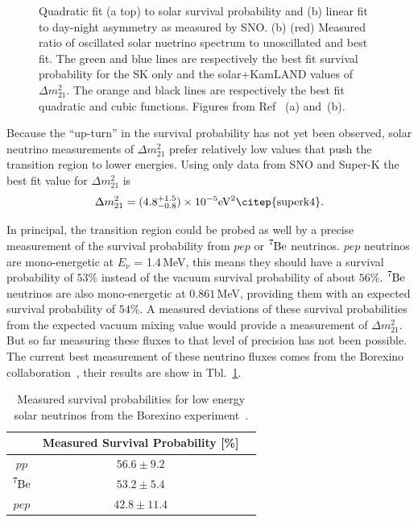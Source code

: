 \begin{figure}[htbp]
\begin{subfigure}[b]{0.58\textwidth}
        \caption[]{}
    \end{subfigure}
    \caption[SNO \& Super-K Measured Solar Survival Probability ]{
        Quadratic fit (a top) to solar survival probability and (b) linear
    fit to day-night asymmetry as measured by SNO.
    (b) (red) Measured ratio of oscillated solar nuetrino spectrum to
    unoscillated and best fit. The green and blue lines are respectively the
    best fit survival probability for the SK only and the solar+KamLAND
    values of $\Delta m^{2}_{21}$. The orange and black lines are respectively the best
    fit quadratic and cubic functions. Figures from Ref~\citep{sno_combined} (a)
    and~\citep{superk4}(b).}
    \label{fig:es_b8_measurement}
\end{figure}

Because the ``up-turn'' in the survival probability has not yet been observed,
solar neutrino measurements of $\Delta m^{2}_{21}$ prefer relatively low values
that push the transition region to lower energies.
Using only data from SNO and Super-K the best fit value for 
$\Delta m^{2}_{21}$ is
\begin{equation*}
    \Delta m^{2}_{21} = (4.8^{+1.5}_{-0.8})\times 10^{-5} \mathrm{eV}^{2}\text{\citep{superk4}.}
\end{equation*}


In principal, the transition region could be probed as well by a precise
measurement of the survival probability from $pep$ or $\ce{^{7}Be}$ neutrinos.
$pep$ neutrinos are mono-energetic at $E_{\nu}$ = 1.4\,MeV,
this means they should have a survival probability of $53\%$ instead of the
vacuum survival probability of about $56\%$.
$\ce{^{7}Be}$ neutrinos are also mono-energetic at $0.861$\,MeV, providing
them with an expected survival probability of $54\%$.
A measured deviations of these survival probabilities from the expected
vacuum mixing value would provide a measurement of $\Delta m^{2}_{21}$.
But so far measuring these fluxes to that level of precision has not been
possible.
The current best measurement of these neutrino fluxes comes from the Borexino
collaboration~\citep{borexino_nature}, their results are show in Tbl.~\ref{tbl:borexino_results}.
\begin{table}
    \centering
    \begin{tabular} {c| c c}
        & Measured Survival Probability [\%]\\
        \hline
        $pp$ & $56.6 \pm  9.2$\\
        $\ce{^{7}Be}$ & $53.2\pm 5.4$ \\
        $pep$ & $42.8\pm11.4$ \\
    \end{tabular}
    \caption[Borexino Measured Low Energy Survival Probabilities]{
        Measured survival probabilities for low energy solar neutrinos
        from the Borexino experiment~\citep{borexino_nature}.}
    \label{tbl:borexino_results}
\end{table}

